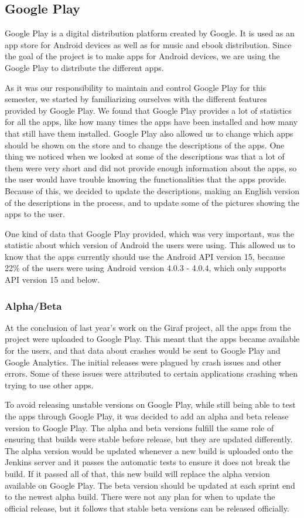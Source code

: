 \subsection{Google Play}
Google Play is a digital distribution platform created by Google. It is used as an app store for Android devices as well as for music and ebook distribution. Since the goal of the project is to make apps for Android devices, we are using the Google Play to distribute the different apps. \citep{GooglePlay}

As it was our responsibility to maintain and control Google Play for this semester, we started by familiarizing ourselves with the different features provided by Google Play. We found that Google Play provides a lot of statistics for all the apps, like how many times the apps have been installed and how many that still have them installed. Google Play also allowed us to change which apps should be shown on the store and to change the descriptions of the apps. One thing we noticed when we looked at some of the descriptions was that a lot of them were very short and did not provide enough information about the apps, so the user would have trouble knowing the functionalities that the apps provide. Because of this, we decided to update the descriptions, making an English version of the descriptions in the process, and to update some of the pictures showing the apps to the user.

One kind of data that Google Play provided, which was very important, was the statistic about which version of Android the users were using. This allowed us to know that the apps currently should use the Android API version 15, because 22\% of the users were using Android version 4.0.3 - 4.0.4, which only supports API version 15 and below. \citep{API15}

\subsubsection{Alpha/Beta}
At the conclusion of last year's work on the Giraf project, all the apps from the project were uploaded to Google Play. This meant that the apps became available for the users, and that data about crashes would be sent to Google Play and Google Analytics. The initial releases were plagued by crash issues and other errors. Some of these issues were attributed to certain applications crashing when trying to use other apps.

To avoid releasing unstable versions on Google Play, while still being able to test the apps through Google Play, it was decided to add an alpha and beta release version to Google Play. The alpha and beta versions fulfill the same role of ensuring that builds were stable before release, but they are updated differently. The alpha version would be updated whenever a new build is uploaded onto the Jenkins server and it passes the automatic tests to ensure it does not break the build. If it passed all of that, this new build will replace the alpha version available on Google Play. The beta version should be updated at each sprint end to the newest alpha build. There were not any plan for when to update the official release, but it follows that stable beta versions can be released officially.

